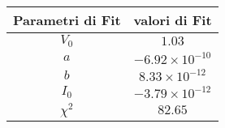 \begin{tabular}{cc}
\hline
	Parametri di Fit & valori di Fit\\ 
\hline
	$V_0$ & $1.03$ \\
	$a$ & $-6.92\times 10^{-10}$ \\
	$b$ & $8.33\times 10^{-12}$ \\
	$I_0$ & $-3.79\times 10^{-12}$ \\
	$\chi^2$ & $82.65$ \\
\hline
\end{tabular}
